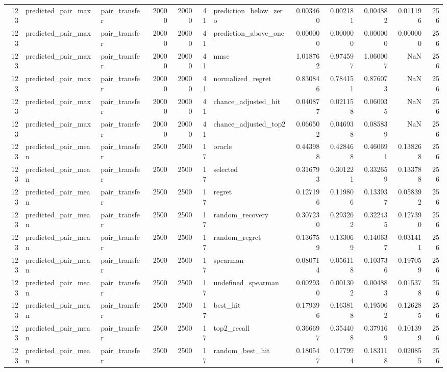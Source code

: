 \begin{tabular}{rllrrrlrrrrr}
123 & predicted_pair_max & pair_transfer & 20000 & 20000 & 41 & prediction_below_zero & 0.003460 & 0.002181 & 0.004882 & 0.011196 & 256 \\
123 & predicted_pair_max & pair_transfer & 20000 & 20000 & 41 & prediction_above_one & 0.000000 & 0.000000 & 0.000000 & 0.000000 & 256 \\
123 & predicted_pair_max & pair_transfer & 20000 & 20000 & 41 & nmse & 1.018762 & 0.974597 & 1.060007 & NaN & 256 \\
123 & predicted_pair_max & pair_transfer & 20000 & 20000 & 41 & normalized_regret & 0.830846 & 0.784151 & 0.876073 & NaN & 256 \\
123 & predicted_pair_max & pair_transfer & 20000 & 20000 & 41 & chance_adjusted_hit & 0.040877 & 0.021158 & 0.060035 & NaN & 256 \\
123 & predicted_pair_max & pair_transfer & 20000 & 20000 & 41 & chance_adjusted_top2 & 0.066502 & 0.046938 & 0.085839 & NaN & 256 \\
123 & predicted_pair_mean & pair_transfer & 2500 & 2500 & 17 & oracle & 0.443988 & 0.428468 & 0.460691 & 0.138268 & 256 \\
123 & predicted_pair_mean & pair_transfer & 2500 & 2500 & 17 & selected & 0.316793 & 0.301221 & 0.332659 & 0.133788 & 256 \\
123 & predicted_pair_mean & pair_transfer & 2500 & 2500 & 17 & regret & 0.127196 & 0.119806 & 0.133937 & 0.058392 & 256 \\
123 & predicted_pair_mean & pair_transfer & 2500 & 2500 & 17 & random_recovery & 0.307230 & 0.293262 & 0.322435 & 0.127390 & 256 \\
123 & predicted_pair_mean & pair_transfer & 2500 & 2500 & 17 & random_regret & 0.136759 & 0.133069 & 0.140637 & 0.031411 & 256 \\
123 & predicted_pair_mean & pair_transfer & 2500 & 2500 & 17 & spearman & 0.080714 & 0.056118 & 0.103736 & 0.197059 & 256 \\
123 & predicted_pair_mean & pair_transfer & 2500 & 2500 & 17 & undefined_spearman & 0.002930 & 0.001302 & 0.004883 & 0.015378 & 256 \\
123 & predicted_pair_mean & pair_transfer & 2500 & 2500 & 17 & best_hit & 0.179396 & 0.163818 & 0.195062 & 0.126285 & 256 \\
123 & predicted_pair_mean & pair_transfer & 2500 & 2500 & 17 & top2_recall & 0.366697 & 0.354408 & 0.379169 & 0.101399 & 256 \\
123 & predicted_pair_mean & pair_transfer & 2500 & 2500 & 17 & random_best_hit & 0.180547 & 0.177994 & 0.183118 & 0.020855 & 256 \\

\end{tabular}
